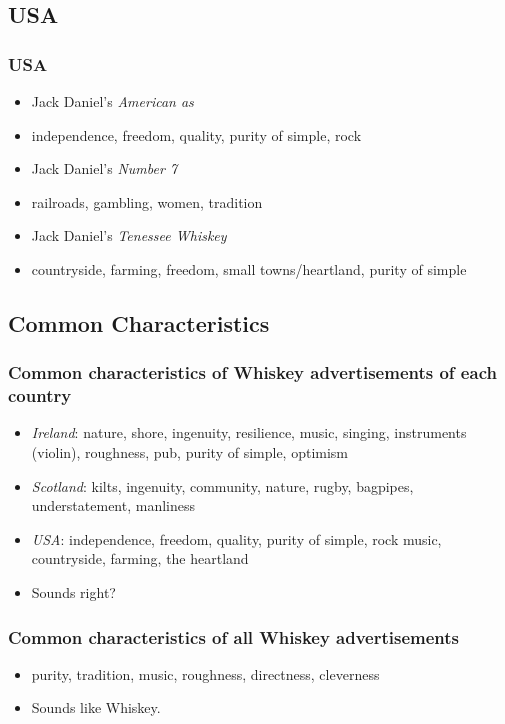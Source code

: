 \documentclass{beamer}
\begin{document}
\subsection{USA}

\begin{frame}
 \frametitle{USA}
 \begin{itemize}
  \item<1-> Jack Daniel's \emph{American as}
  \item<2-> independence, freedom, quality, purity of simple, rock
  \item<3-> Jack Daniel's \emph{Number 7}
  \item<4-> railroads, gambling, women, tradition
  \item<5-> Jack Daniel's \emph{Tenessee Whiskey}
  \item<6-> countryside, farming, freedom, small towns/heartland, purity of simple
 \end{itemize}
\end{frame}

\subsection{Common Characteristics}

\begin{frame}
 \frametitle{Common characteristics of Whiskey advertisements of each country}
 \begin{itemize}
  \item<2->\emph{Ireland}: nature, shore, ingenuity, resilience, music, singing, instruments (violin), roughness, pub, purity of simple, optimism
  \item<3->\emph{Scotland}: kilts, ingenuity, community, nature, rugby, bagpipes, understatement, manliness
  \item<4->\emph{USA}: independence, freedom, quality, purity of simple, rock music, countryside, farming, the heartland
  \item<5->Sounds right?
 \end{itemize}
\end{frame}

\begin{frame}
 \frametitle{Common characteristics of all Whiskey advertisements}
 \begin{itemize}
  \item<2->purity, tradition, music, roughness, directness, cleverness
  \item<3->Sounds like Whiskey.
 \end{itemize}
\end{frame}
\end{document}
